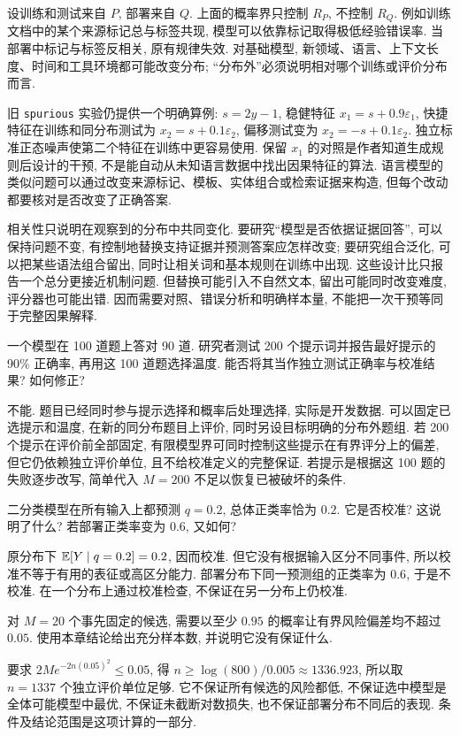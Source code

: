 设训练和测试来自 $P$, 部署来自 $Q$. 上面的概率界只控制 $R_P$, 不控制 $R_Q$. 例如训练文档中的某个来源标记总与标签共现, 模型可以依靠标记取得极低经验错误率. 当部署中标记与标签反相关, 原有规律失效. 对基础模型, 新领域、语言、上下文长度、时间和工具环境都可能改变分布; “分布外”必须说明相对哪个训练或评价分布而言.

旧 \texttt{spurious} 实验仍提供一个明确算例: $s=2y-1$, 稳健特征 $x_1=s+0.9\varepsilon_1$, 快捷特征在训练和同分布测试为 $x_2=s+0.1\varepsilon_2$, 偏移测试变为 $x_2=-s+0.1\varepsilon_2$. 独立标准正态噪声使第二个特征在训练中更容易使用. 保留 $x_1$ 的对照是作者知道生成规则后设计的干预, 不是能自动从未知语言数据中找出因果特征的算法. 语言模型的类似问题可以通过改变来源标记、模板、实体组合或检索证据来构造, 但每个改动都要核对是否改变了正确答案.

相关性只说明在观察到的分布中共同变化. 要研究“模型是否依据证据回答”, 可以保持问题不变, 有控制地替换支持证据并预测答案应怎样改变; 要研究组合泛化, 可以把某些语法组合留出, 同时让相关词和基本规则在训练中出现. 这些设计比只报告一个总分更接近机制问题. 但替换可能引入不自然文本, 留出可能同时改变难度, 评分器也可能出错. 因而需要对照、错误分析和明确样本量, 不能把一次干预等同于完整因果解释.

\begin{exercise}
一个模型在 100 道题上答对 90 道. 研究者测试 200 个提示词并报告最好提示的 90\% 正确率, 再用这 100 道题选择温度. 能否将其当作独立测试正确率与校准结果? 如何修正?
\end{exercise}
\begin{solution}
不能. 题目已经同时参与提示选择和概率后处理选择, 实际是开发数据. 可以固定已选提示和温度, 在新的同分布题目上评价, 同时另设目标明确的分布外题组. 若 200 个提示在评价前全部固定, 有限模型界可同时控制这些提示在有界评分上的偏差, 但它仍依赖独立评价单位, 且不给校准定义的完整保证. 若提示是根据这 100 题的失败逐步改写, 简单代入 $M=200$ 不足以恢复已被破坏的条件.
\end{solution}
\begin{exercise}
二分类模型在所有输入上都预测 $q=0.2$, 总体正类率恰为 $0.2$. 它是否校准? 这说明了什么? 若部署正类率变为 $0.6$, 又如何?
\end{exercise}
\begin{solution}
原分布下 $\mathbb E[Y\mid q=0.2]=0.2$, 因而校准. 但它没有根据输入区分不同事件, 所以校准不等于有用的表征或高区分能力. 部署分布下同一预测组的正类率为 $0.6$, 于是不校准. 在一个分布上通过校准检查, 不保证在另一分布上仍校准.
\end{solution}
\begin{exercise}
对 $M=20$ 个事先固定的候选, 需要以至少 $0.95$ 的概率让有界风险偏差均不超过 $0.05$. 使用本章结论给出充分样本数, 并说明它没有保证什么.
\end{exercise}
\begin{solution}
要求 $2M e^{-2n(0.05)^2}\le0.05$, 得
$n\ge\log(800)/0.005\approx1336.923$, 所以取 $n=1337$ 个独立评价单位足够. 它不保证所有候选的风险都低, 不保证选中模型是全体可能模型中最优, 不保证未截断对数损失, 也不保证部署分布不同后的表现. 条件及结论范围是这项计算的一部分.
\end{solution}
\label{ch:end:05}
